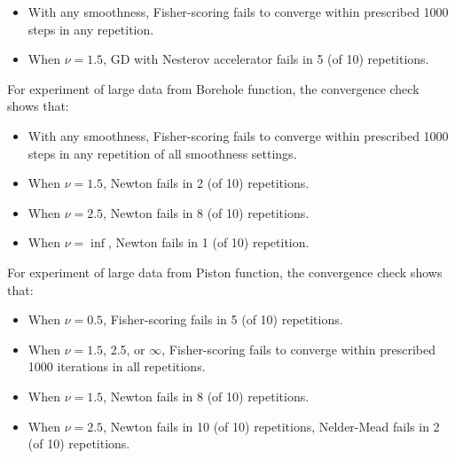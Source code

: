 \begin{itemize}
    \item With any smoothness, Fisher-scoring fails to converge within prescribed 1000 steps in any repetition.
    \item When $\nu = 1.5$, GD with Nesterov accelerator fails in 5 (of 10) repetitions.
\end{itemize}

For experiment of large data from Borehole function, the convergence check shows that:

\begin{itemize}
    \item With any smoothness, Fisher-scoring fails to converge within prescribed 1000 steps in any repetition of all smoothness settings.
    \item When $\nu = 1.5$, Newton fails in 2 (of 10) repetitions.
    \item When $\nu = 2.5$, Newton fails in 8 (of 10) repetitions.
    \item When $\nu = \inf$, Newton fails in 1 (of 10) repetition.
\end{itemize}

For experiment of large data from Piston function, the convergence check shows that:

\begin{itemize}
    \item When $\nu=0.5$, Fisher-scoring fails in 5 (of 10) repetitions.
    \item When $\nu=1.5$, 2.5, or $\infty$, Fisher-scoring fails to converge within prescribed 1000 iterations in all repetitions.
    \item When $\nu = 1.5$, Newton fails in 8 (of 10) repetitions.
    \item When $\nu = 2.5$, Newton fails in 10 (of 10) repetitions, Nelder-Mead fails in 2 (of 10) repetitions.
\end{itemize}






